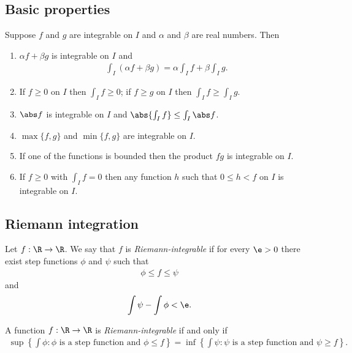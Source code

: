 \documentclass{article}
\begin{document}
\subsection{Basic properties}

\begin{theorem}[Notes 4.2]
    Suppose $f$ and $g$ are integrable on $I$ and $\alpha$ and $\beta$ are real numbers. Then 
    \begin{enumerate}
        \item $\alpha f + \beta g$ is integrable on $I$ and \begin{align*}
            \int_I (\alpha f + \beta g) = \alpha \int_I f + \beta \int_I g.
        \end{align*}
        \item If $f\geq 0$ on $I$ then $\int_I f \geq 0$; if $f\geq g$ on $I$ then $\int_I f\geq \int_I g$.
        \item $\abs f$ is integrable on $I$ and $\abs{\int_I f}\leq \int_I \abs f$.
        \item $\max\{f,g\}$ and $\min\{f,g\}$ are integrable on $I$.
        \item If one of the functions is bounded then the product $fg$ is integrable on $I$.
        \item If $f\geq 0$ with $\int_I f = 0$ then any function $h$ such that $0\leq h<f$ on $I$ is integrable on $I$.
    \end{enumerate}
\end{theorem}

\subsection{Riemann integration}

\begin{definition}[Notes 4.4]
    Let $f:\R\to\R$. We say that $f$ is \emph{Riemann-integrable} if for every 
    $\e>0$ there exist step functions $\phi$ and $\psi$ such that 
    \begin{align*}
        \phi \leq f \leq \psi 
    \end{align*}
    and
    \begin{align*}
        \int \psi - \int \phi < \e.
    \end{align*}
\end{definition}

\begin{theorem}[Notes 4.5]
    A function $f:\R\to\R$ is \emph{Riemann-integrable} if and only if 
    \begin{align*}
        \sup\left\lbrace\int\phi : \phi\text{ is a step function and }\phi\leq f\right\rbrace
        = \inf\left\lbrace\int\psi : \psi\text{ is a step function and }\psi \geq f\right\rbrace.
    \end{align*} 
\end{theorem}
\end{document}
